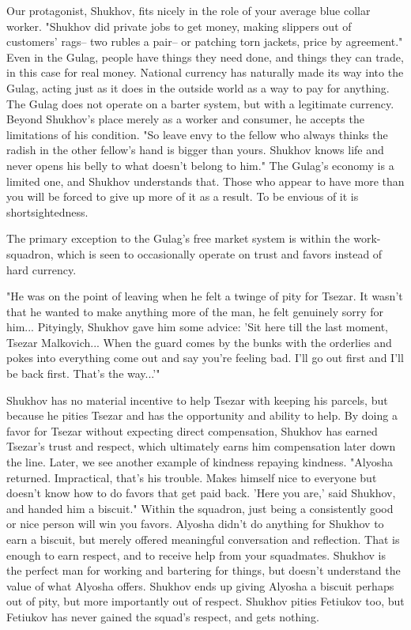 \documentclass[12pt]{article}
\begin{document}
\begin{flushleft}
Our protagonist, Shukhov, fits nicely in the role of your average blue collar worker.
"Shukhov did private jobs to get money, making slippers out of customers' rags-- two rubles a pair-- or patching torn jackets, price by agreement."\footnotemark
Even in the Gulag, people have things they need done, and things they can trade, in this case for real money. 
National currency has naturally made its way into the Gulag, acting just as it does in the outside world as a way to pay for anything. The Gulag does not operate on a barter system, but with a legitimate currency.
Beyond Shukhov's place merely as a worker and consumer, he accepts the limitations of his condition. "So leave envy to the fellow who always thinks the radish in the other fellow's hand is bigger than yours. Shukhov knows life and never opens his belly to what doesn't belong to him."\footnotemark
The Gulag's economy is a limited one, and Shukhov understands that. 
Those who appear to have more than you will be forced to give up more of it as a result. To be envious of it is shortsightedness. 

The primary exception to the Gulag's free market system is within the work-squadron, which is seen to occasionally operate on trust and favors instead of hard currency.


\begin{center}
"He was on the point of leaving when he felt a twinge of pity for Tsezar. 
It wasn't that he wanted to make anything more of the man, he felt genuinely sorry for him... Pityingly, Shukhov gave him some advice: 
'Sit here till the last moment, Tsezar Malkovich... 
When the guard comes by the bunks with the orderlies and pokes into everything come out and say you're feeling bad. 
I'll go out first and I'll be back first. That's the way...'"\footnotemark
\end{center}

Shukhov has no material incentive to help Tsezar with keeping his parcels, but because he pities Tsezar and has the opportunity and ability to help.
By doing a favor for Tsezar without expecting direct compensation, Shukhov has earned Tsezar's trust and respect, which ultimately earns him compensation later down the line. 
Later, we see another example of kindness repaying kindness.
"Alyosha returned. Impractical, that's his trouble. Makes himself nice to everyone but doesn't know how to do favors that get paid back. 'Here you are,' said Shukhov, and handed him a biscuit."\footnotemark
Within the squadron, just being a consistently good or nice person will win you favors. Alyosha didn't do anything for Shukhov to earn a biscuit, but merely offered meaningful conversation and reflection. That is enough to earn respect, and to receive help from your squadmates.
Shukhov is the perfect man for working and bartering for things, but doesn't understand the value of what Alyosha offers. Shukhov ends up giving Alyosha a biscuit perhaps out of pity, but more importantly out of respect. Shukhov pities Fetiukov too, but Fetiukov has never gained the squad's respect, and gets nothing.



\end{flushleft}
\end{document}
